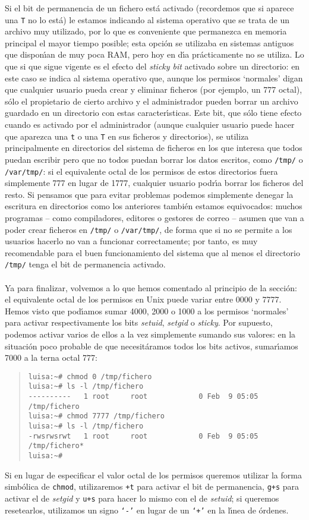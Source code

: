Si el bit de permanencia de un fichero est\'a activado (recordemos que si 
aparece una {\tt T} no lo est\'a) le estamos indicando al sistema operativo que 
se trata de un archivo muy utilizado, por lo que es conveniente que permanezca
en memoria principal el mayor tiempo posible; esta opci\'on se utilizaba en 
sistemas antiguos que dispon\'{\i}an de muy poca RAM, pero hoy en d\'{\i}a
pr\'acticamente no se utiliza. Lo que si que sigue vigente es el efecto del 
{\it sticky bit} activado sobre un directorio: en este caso se indica al
sistema operativo que, aunque los permisos `normales' digan que cualquier 
usuario pueda crear y eliminar ficheros (por ejemplo, un 777 octal), s\'olo el
propietario de cierto archivo y el administrador pueden borrar un archivo 
guardado en un directorio con estas caracter\'{\i}sticas. Este bit, que s\'olo
tiene efecto cuando es activado por el administrador (aunque cualquier
usuario puede hacer que aparezca una {\tt t} o una {\tt T} en sus ficheros y
directorios), se utiliza principalmente en directorios del sistema de ficheros
en los que interesa que todos puedan escribir pero que no todos puedan borrar
los datos escritos, como {\tt /tmp/} o {\tt /var/tmp/}: si el equivalente octal
de los permisos de estos directorios fuera simplemente 777 en lugar de 1777,
cualquier usuario podr\'{\i}a borrar los ficheros del resto. Si pensamos que 
para evitar problemas podemos simplemente denegar la escritura en directorios
como los anteriores tambi\'en estamos equivocados: muchos programas -- como 
compiladores, editores o gestores de correo -- asumen que van a poder crear
ficheros en {\tt /tmp/} o {\tt /var/tmp/}, de forma que si no se permite a los
usuarios hacerlo no van a funcionar correctamente; por tanto, es muy 
recomendable para el buen funcionamiento del sistema que al menos el 
directorio {\tt /tmp/} tenga el bit de permanencia activado.\\
\\Ya para finalizar, volvemos a lo que hemos comentado al principio de la
secci\'on: el equivalente octal de los permisos en Unix puede variar entre 0000
y 7777. Hemos visto que pod\'{\i}amos sumar 4000, 2000 o 1000 a los permisos
`normales' para activar respectivamente los bits {\it setuid}, {\it setgid} o
{\it sticky}. Por supuesto, podemos activar varios de ellos a la vez simplemente
sumando sus valores: en la situaci\'on poco probable de que necesit\'aramos 
todos los bits activos, sumar\'{\i}amos 7000 a la terna octal 777:
\begin{quote}
\begin{verbatim}
luisa:~# chmod 0 /tmp/fichero
luisa:~# ls -l /tmp/fichero 
----------   1 root     root            0 Feb  9 05:05 /tmp/fichero
luisa:~# chmod 7777 /tmp/fichero
luisa:~# ls -l /tmp/fichero 
-rwsrwsrwt   1 root     root            0 Feb  9 05:05 /tmp/fichero*
luisa:~#
\end{verbatim}
\end{quote}
Si en lugar de especificar el valor octal de los permisos queremos utilizar
la forma simb\'olica de {\tt chmod}, utilizaremos {\tt +t} para activar el
bit de permanencia, {\tt g+s} para activar el de {\it setgid} y {\tt u+s} para 
hacer lo mismo con el de {\it setuid}; si queremos resetearlos, utilizamos un
signo {\tt `-'} en lugar de un {\tt `+'} en la l\'{\i}nea de \'ordenes.
